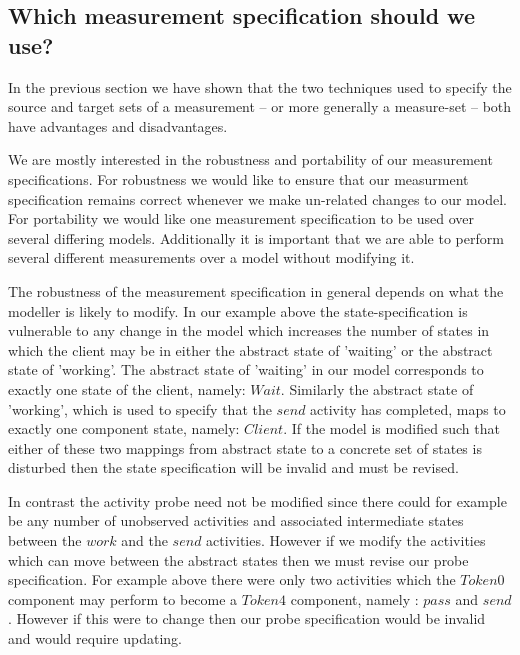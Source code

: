 \documentclass[times, 10pt,twocolumn]{article}
\newcommand{\quoteActivity}[1]{$#1$}
\newcommand{\quoteProcess}[1]{$#1$}
\begin{document}
\subsection{Which measurement specification should we use?}

In the previous section we have shown that the two techniques
used to specify the source and target sets of a measurement
-- or more generally a measure-set -- both have advantages and
disadvantages.

We are mostly interested in the robustness and portability of our
measurement specifications. For robustness we would like to ensure
that our measurment specification remains correct whenever we make
un-related changes to our model. For portability we would like one
measurement specification to be used over several differing models.
Additionally it is important that we are able to perform several
different measurements over a model without modifying it.

The robustness of the measurement specification in general depends on
what the modeller is likely to modify.
In our example above the state-specification is vulnerable to any change
in the model which increases the number of states in which the client
may be in either the abstract state of 'waiting' or the abstract state
of 'working'. The abstract state of 'waiting' in our model corresponds
to exactly one state of the client, namely: \quoteProcess{Wait}.
Similarly the abstract state of 'working', which is used to specify
that the \quoteActivity{send} activity has completed, maps to exactly
one component state, namely: \quoteProcess{Client}.
If the model is modified such that either of these two mappings from
abstract state to a concrete set of states is disturbed then the
state specification will be invalid and must be revised.

In contrast the activity probe need not be modified since there could
for example be any number of unobserved activities and associated
intermediate states between the \quoteActivity{work} and the
\quoteActivity{send} activities. However if we modify the activities
which can move between the abstract states then we must revise
our probe specification. For example above there were only two activities
which the \quoteProcess{Token0} component may perform to become a
\quoteProcess{Token4} component, namely : \quoteActivity{pass}
and \quoteActivity{send}. However if this were to change then our
probe specification would be invalid and would require updating.
\end{document}
